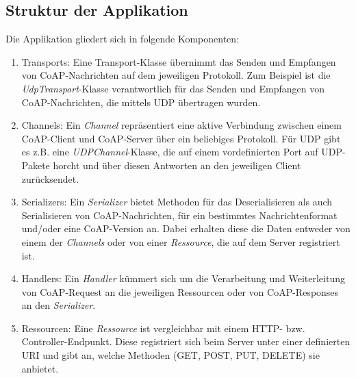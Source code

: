 \subsection{Struktur der Applikation}
\label{subsec:struktur-der-applikation}

Die Applikation gliedert sich in folgende Komponenten:
\begin{enumerate}
    \item Transports: Eine Transport-Klasse übernimmt das Senden und Empfangen von CoAP-Nachrichten auf dem jeweiligen Protokoll. Zum Beispiel ist die \textit{UdpTransport}-Klasse verantwortlich für das Senden und Empfangen von CoAP-Nachrichten, die mittels UDP übertragen wurden.
    \item Channels: Ein \textit{Channel} repräsentiert eine aktive Verbindung zwischen einem CoAP-Client und CoAP-Server über ein beliebiges Protokoll. Für UDP gibt es z.B. eine \textit{UDPChannel}-Klasse, die auf einem vordefinierten Port auf UDP-Pakete horcht und über diesen Antworten an den jeweiligen Client zurücksendet.
    \item Serializers: Ein \textit{Serializer} bietet Methoden für das Deserialisieren als auch Serialisieren von CoAP-Nachrichten, für ein bestimmtes Nachrichtenformat und/oder eine CoAP-Version an. Dabei erhalten diese die Daten entweder von einem der \textit{Channels} oder von einer \textit{Ressource}, die auf dem Server registriert ist.
    \item Handlers: Ein \textit{Handler} kümmert sich um die Verarbeitung und Weiterleitung von CoAP-Request an die jeweiligen Ressourcen oder von CoAP-Responses an den \textit{Serializer}.
    \item Ressourcen: Eine \textit{Ressource} ist vergleichbar mit einem HTTP- bzw. Controller-Endpunkt. Diese registriert sich beim Server unter einer definierten URI und gibt an, welche Methoden (GET, POST, PUT, DELETE) sie anbietet.
\end{enumerate}

